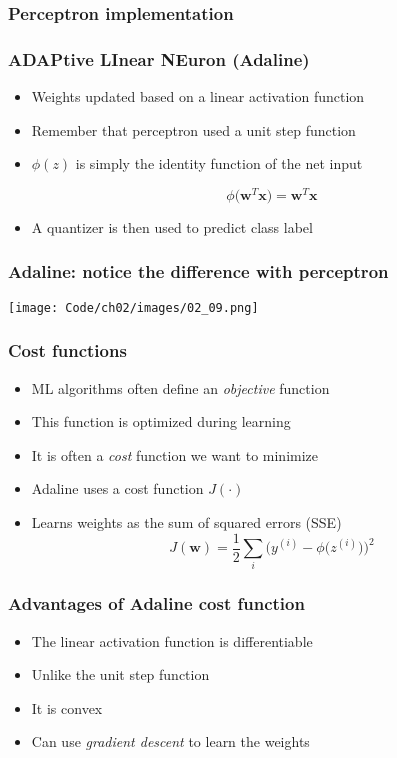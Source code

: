 \documentclass{beamer}
\begin{document}
\begin{frame}
  \frametitle{Perceptron implementation}
  \href{https://github.com/rasbt/python-machine-learning-book/blob/master/code/ch02/ch02.ipynb}{}
\end{frame}

\begin{frame}
  \frametitle{ADAPtive LInear NEuron (Adaline)}
  \begin{itemize}
  \item Weights updated based on a linear activation function
  \item Remember that perceptron used a unit step function
  \item  $\phi(z)$ is simply the identity function of the net input

    \[
    \phi \big( \mathbf{w}^T \mathbf{x} \big) = \mathbf{w}^T \mathbf{x}
    \]
    
    \item A quantizer is then used to predict class label
  \end{itemize}
\end{frame}

\begin{frame}
  \frametitle{Adaline: notice the difference with perceptron}
  \texttt{[image: Code/ch02/images/02\_09.png]}
\end{frame}

\begin{frame}
  \frametitle{Cost functions}
  \begin{itemize}
  \item ML algorithms often define an \emph{objective} function
  \item This function is optimized during learning
  \item It is often a \emph{cost} function we want to minimize
  \item Adaline uses a cost function $J(\cdot)$
  \item Learns weights as the sum of squared errors (SSE)
    \[
    J(\mathbf{w}) = \frac{1}{2} \sum_i \bigg(y^{(i)}  - \phi \big(z^{(i)} \big) \bigg)^2
    \]
  \end{itemize}
\end{frame}

\begin{frame}
  \frametitle{Advantages of Adaline cost function}
  \begin{itemize}
  \item The linear activation function is differentiable
  \item Unlike the unit step function
  \item It is convex
  \item Can use \emph{gradient descent} to learn the weights
  \end{itemize}
\end{frame}
\end{document}

